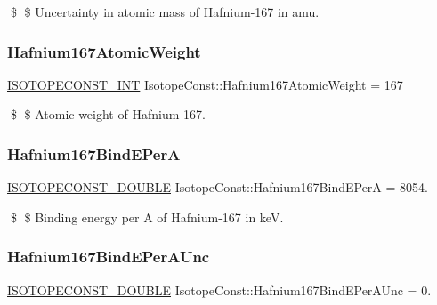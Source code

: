 \$ \$ Uncertainty in atomic mass of Hafnium-\/167 in amu. \mbox{\label{group___isotope_const-_hafnium-_hf167_gab832d2befe9aedf708355bd08cb05ddd}} 
\subsubsection{\texorpdfstring{Hafnium167\+Atomic\+Weight}{Hafnium167AtomicWeight}}
{\footnotesize\ttfamily \mbox{\hyperlink{group___isotope_const-_macros_ga5f18360b3e99483a35c32d789e62621c}{I\+S\+O\+T\+O\+P\+E\+C\+O\+N\+S\+T\+\_\+\+I\+NT}} Isotope\+Const\+::\+Hafnium167\+Atomic\+Weight = 167}

\$ \$ Atomic weight of Hafnium-\/167. \mbox{\label{group___isotope_const-_hafnium-_hf167_gae71a43ecb271c8f5e5de604a8cfb75ec}} 
\subsubsection{\texorpdfstring{Hafnium167\+Bind\+E\+PerA}{Hafnium167BindEPerA}}
{\footnotesize\ttfamily \mbox{\hyperlink{group___isotope_const-_macros_ga8f45a7272ce02c0b4c65c44636ed719a}{I\+S\+O\+T\+O\+P\+E\+C\+O\+N\+S\+T\+\_\+\+D\+O\+U\+B\+LE}} Isotope\+Const\+::\+Hafnium167\+Bind\+E\+PerA = 8054.}

\$ \$ Binding energy per A of Hafnium-\/167 in keV. \mbox{\label{group___isotope_const-_hafnium-_hf167_gacd7e89ea942a53a8f55434f42d865be2}} 
\subsubsection{\texorpdfstring{Hafnium167\+Bind\+E\+Per\+A\+Unc}{Hafnium167BindEPerAUnc}}
{\footnotesize\ttfamily \mbox{\hyperlink{group___isotope_const-_macros_ga8f45a7272ce02c0b4c65c44636ed719a}{I\+S\+O\+T\+O\+P\+E\+C\+O\+N\+S\+T\+\_\+\+D\+O\+U\+B\+LE}} Isotope\+Const\+::\+Hafnium167\+Bind\+E\+Per\+A\+Unc = 0.}

